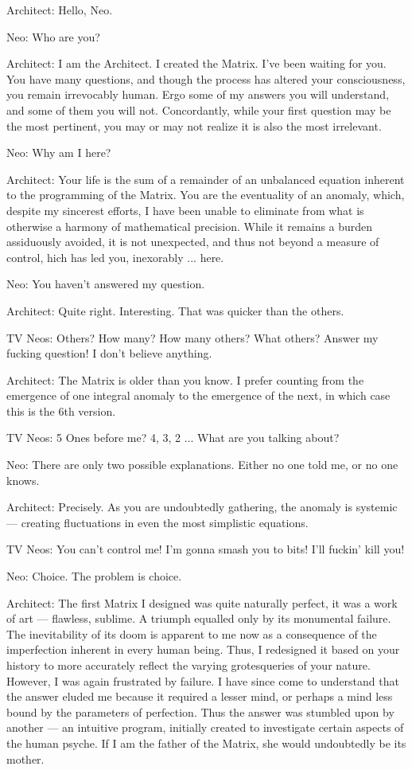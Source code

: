 \documentclass[UTF8]{ctexart}
\newenvironment{myquote}{\color{green} \setlength{\leftskip}{6em} \setlength{\rightskip}{4em} \setlength{\parindent}{-2em}}{\par}
\begin{document}
\begin{myquote}
Architect: Hello, Neo.

Neo: Who are you?

Architect: I am the Architect. I created the Matrix. I've been waiting for you. You have many questions, and though the process has altered your consciousness, you remain irrevocably human. Ergo some of my answers you will understand, and some of them you will not. Concordantly, while your first question may be the most pertinent, you may or may not realize it is also the most irrelevant.

Neo: Why am I here?

Architect: Your life is the sum of a remainder of an unbalanced equation inherent to the programming of the Matrix. You are the eventuality of an anomaly, which, despite my sincerest efforts, I have been unable to eliminate from what is otherwise a harmony of mathematical precision. While it remains a burden assiduously avoided, it is not unexpected, and thus not beyond a measure of control, hich has led you, inexorably ... here.

Neo: You haven't answered my question.

Architect: Quite right. Interesting. That was quicker than the others.

TV Neos: Others? How many? How many others? What others? Answer my fucking question! I don't believe anything.

Architect: The Matrix is older than you know. I prefer counting from the emergence of one integral anomaly to the emergence of the next, in which case this is the 6th version.

TV Neos: 5 Ones before me? 4, 3, 2 ... What are you talking about?

Neo: There are only two possible explanations. Either no one told me, or no one knows.

Architect: Precisely. As you are undoubtedly gathering, the anomaly is systemic --- creating fluctuations in even the most simplistic equations.

TV Neos: You can't control me! I'm gonna smash you to bits! I'll fuckin' kill you!

Neo: Choice. The problem is choice.

Architect: The first Matrix I designed was quite naturally perfect, it was a work of art --- flawless, sublime. A triumph equalled only by its monumental failure. The inevitability of its doom is apparent to me now as a consequence of the imperfection inherent in every human being. Thus, I redesigned it based on your history to more accurately reflect the varying grotesqueries of your nature. However, I was again frustrated by failure. I have since come to understand that the answer eluded me because it required a lesser mind, or perhaps a mind less bound by the parameters of perfection. Thus the answer was stumbled upon by another --- an intuitive program, initially created to investigate certain aspects of the human psyche. If I am the father of the Matrix, she would undoubtedly be its mother.


\end{myquote}
\end{document}
